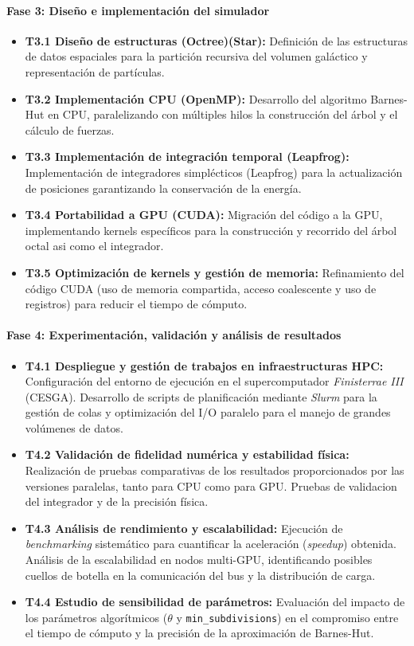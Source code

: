 \paragraph{Fase 3: Diseño e implementación del simulador}
\begin{itemize}
    \item \textbf{T3.1 Diseño de estructuras (Octree)(Star):} Definición de las estructuras de datos espaciales para la partición recursiva del volumen galáctico y representación de partículas.
    \item \textbf{T3.2 Implementación CPU (OpenMP):} Desarrollo del algoritmo Barnes-Hut en CPU, paralelizando con múltiples hilos la construcción del árbol y el cálculo de fuerzas.
    \item \textbf{T3.3 Implementación de integración temporal (Leapfrog):} Implementación de integradores simplécticos (Leapfrog) para la actualización de posiciones garantizando la conservación de la energía.
    \item \textbf{T3.4 Portabilidad a GPU (CUDA):} Migración del código a la GPU, implementando kernels específicos para la construcción y recorrido del árbol octal asi como el integrador.
    \item \textbf{T3.5 Optimización de kernels y gestión de memoria:} Refinamiento del código CUDA (uso de memoria compartida, acceso coalescente y uso de registros) para reducir el tiempo de cómputo.
\end{itemize}

\paragraph{Fase 4: Experimentación, validación y análisis de resultados}
\begin{itemize}
    \item \textbf{T4.1 Despliegue y gestión de trabajos en infraestructuras HPC:} Configuración del entorno de ejecución en el supercomputador \textit{Finisterrae III} (CESGA). Desarrollo de scripts de planificación mediante \textit{Slurm} para la gestión de colas y optimización del I/O paralelo para el manejo de grandes volúmenes de datos.
    \item \textbf{T4.2 Validación de fidelidad numérica y estabilidad física:} Realización de pruebas comparativas de los resultados proporcionados por las versiones paralelas, tanto para CPU como para GPU. Pruebas de validacion del integrador y de la precisión física.
    \item \textbf{T4.3 Análisis de rendimiento y escalabilidad:} Ejecución de \textit{benchmarking} sistemático para cuantificar la aceleración (\textit{speedup}) obtenida. Análisis de la escalabilidad en nodos multi-GPU, identificando posibles cuellos de botella en la comunicación del bus y la distribución de carga.
    \item \textbf{T4.4 Estudio de sensibilidad de parámetros:} Evaluación del impacto de los parámetros algorítmicos ($\theta$ y \texttt{min\_subdivisions}) en el compromiso entre el tiempo de cómputo y la precisión de la aproximación de Barnes-Hut.
\end{itemize}

